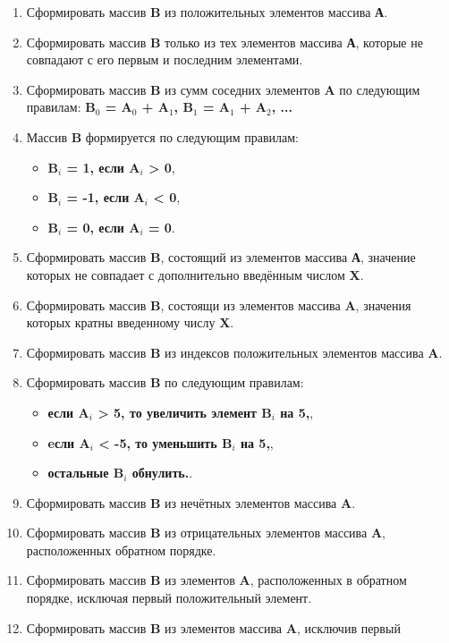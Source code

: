 \begin{enumerate}
    \item Сформировать массив \textbf{B} из положительных элементов массива \textbf{А}.
    \item Сформировать массив \textbf{B} только из тех элементов массива \textbf{А}, которые не совпадают с его первым и последним элементами.
    \item  Сформировать массив \textbf{B} из сумм соседних элементов \textbf{A} по следующим правилам:
           \textbf{ B$_0$ = A$_0$ + A$_1$, B$_1$ = A$_1$ + A$_2$, ... }
    \item Массив \textbf{B} формируется по следующим правилам:
    \begin{itemize}
        \item \textbf{B$_i$ = 1, если A$_i$ > 0},
        \item \textbf{B$_i$ = -1, если A$_i$ < 0},
        \item \textbf{B$_i$ = 0, если A$_i$ = 0}.
    \end{itemize}
    \item Сформировать массив \textbf{B}, состоящий из элементов массива \textbf{А}, значение которых не совпадает с дополнительно введённым числом \textbf{X}.
    \item Сформировать массив \textbf{B}, состоящи из элементов массива \textbf{A}, значения которых кратны введенному числу \textbf{X}.
    \item Сформировать массив \textbf{B} из индексов положительных элементов массива \textbf{A}.
    \item Сформировать массив \textbf{B} по следующим правилам:
    \begin{itemize}
        \item \textbf{если A$_i$ > 5, то увеличить элемент B$_i$ на 5,},
        \item \textbf{eсли A$_i$ < -5, то уменьшить B$_i$ на 5,},
        \item \textbf{остальные B$_i$ обнулить.}.
    \end{itemize}
    \item Сформировать массив \textbf{B} из нечётных элементов массива \textbf{A}.
    \item Сформировать массив \textbf{B} из отрицательных элементов массива \textbf{A}, расположенных обратном порядке.
    \item Сформировать массив \textbf{B} из элементов \textbf{A}, расположенных в обратном порядке, исключая первый положительный элемент.
    \item Сформировать массив \textbf{B} из элементов массива \textbf{A}, исключив первый

\end{enumerate}
